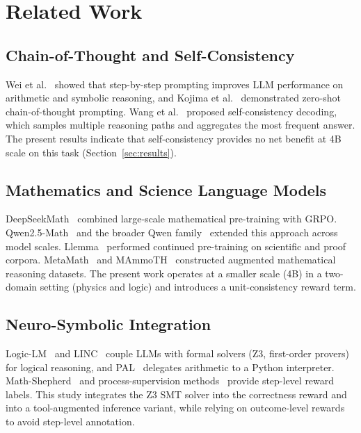 \documentclass[preprint,12pt]{elsarticle}
\begin{document}
\section{Related Work}
\label{sec:related}

\subsection{Chain-of-Thought and Self-Consistency}
Wei et al.~\cite{Wei2022} showed that step-by-step prompting improves LLM
performance on arithmetic and symbolic reasoning, and
Kojima et al.~\cite{Kojima2022} demonstrated zero-shot chain-of-thought
prompting. Wang et al.~\cite{Wang2023sc} proposed self-consistency
decoding, which samples multiple reasoning paths and aggregates the most
frequent answer. The present results indicate that self-consistency
provides no net benefit at 4B scale on this task
(Section~\ref{sec:results}).

\subsection{Mathematics and Science Language Models}
DeepSeekMath~\cite{Shao2024} combined large-scale mathematical
pre-training with GRPO. Qwen2.5-Math~\cite{Yang2024} and the broader Qwen
family~\cite{Qwen2025} extended this approach across model scales.
Llemma~\cite{Azerbayev2024} performed continued pre-training on scientific
and proof corpora. MetaMath~\cite{Yu2023} and MAmmoTH~\cite{Yue2023}
constructed augmented mathematical reasoning datasets. The present work
operates at a smaller scale (4B) in a two-domain setting (physics and
logic) and introduces a unit-consistency reward term.

\subsection{Neuro-Symbolic Integration}
Logic-LM~\cite{Pan2023} and LINC~\cite{Olausson2023} couple LLMs with
formal solvers (Z3, first-order provers) for logical reasoning, and
PAL~\cite{Gao2022} delegates arithmetic to a Python interpreter.
Math-Shepherd~\cite{Wang2024mathshepherd} and process-supervision
methods~\cite{Lightman2023} provide step-level reward labels. This study
integrates the Z3 SMT solver into the correctness reward and into a
tool-augmented inference variant, while relying on outcome-level rewards to
avoid step-level annotation.
\end{document}
